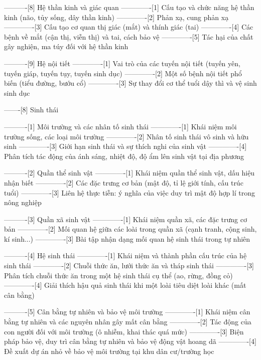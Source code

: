 ----------[8] Hệ thần kinh và giác quan
-------------[1] Cấu tạo và chức năng hệ thần kinh (não, tủy sống, dây thần kinh)
-------------[2] Phản xạ, cung phản xạ
-------------[3] Cấu tạo cơ quan thị giác (mắt) và thính giác (tai)
-------------[4] Các bệnh về mắt (cận thị, viễn thị) và tai, cách bảo vệ
-------------[5] Tác hại của chất gây nghiện, ma túy đối với hệ thần kinh

----------[9] Hệ nội tiết
-------------[1] Vai trò của các tuyến nội tiết (tuyến yên, tuyến giáp, tuyến tụy, tuyến sinh dục)
-------------[2] Một số bệnh nội tiết phổ biến (tiểu đường, bướu cổ)
-------------[3] Sự thay đổi cơ thể tuổi dậy thì và vệ sinh sinh dục

-------[8] Sinh thái

----------[1] Môi trường và các nhân tố sinh thái
-------------[1] Khái niệm môi trường sống, các loại môi trường
-------------[2] Nhân tố sinh thái vô sinh và hữu sinh
-------------[3] Giới hạn sinh thái và sự thích nghi của sinh vật
-------------[4] Phân tích tác động của ánh sáng, nhiệt độ, độ ẩm lên sinh vật tại địa phương

----------[2] Quần thể sinh vật
-------------[1] Khái niệm quần thể sinh vật, dấu hiệu nhận biết
-------------[2] Các đặc trưng cơ bản (mật độ, tỉ lệ giới tính, cấu trúc tuổi)
-------------[3] Liên hệ thực tiễn: ý nghĩa của việc duy trì mật độ hợp lí trong nông nghiệp

----------[3] Quần xã sinh vật
-------------[1] Khái niệm quần xã, các đặc trưng cơ bản
-------------[2] Mối quan hệ giữa các loài trong quần xã (cạnh tranh, cộng sinh, kí sinh...)
-------------[3] Bài tập nhận dạng mối quan hệ sinh thái trong tự nhiên

----------[4] Hệ sinh thái
-------------[1] Khái niệm và thành phần cấu trúc của hệ sinh thái
-------------[2] Chuỗi thức ăn, lưới thức ăn và tháp sinh thái
-------------[3] Phân tích chuỗi thức ăn trong một hệ sinh thái cụ thể (ao, rừng, đồng cỏ)
-------------[4] Giải thích hậu quả sinh thái khi một loài tiêu diệt loài khác (mất cân bằng)

----------[5] Cân bằng tự nhiên và bảo vệ môi trường
-------------[1] Khái niệm cân bằng tự nhiên và các nguyên nhân gây mất cân bằng
-------------[2] Tác động của con người đối với môi trường (ô nhiễm, khai thác quá mức)
-------------[3] Biện pháp bảo vệ, duy trì cân bằng tự nhiên và bảo vệ động vật hoang dã
-------------[4] Đề xuất dự án nhỏ về bảo vệ môi trường tại khu dân cư/trường học